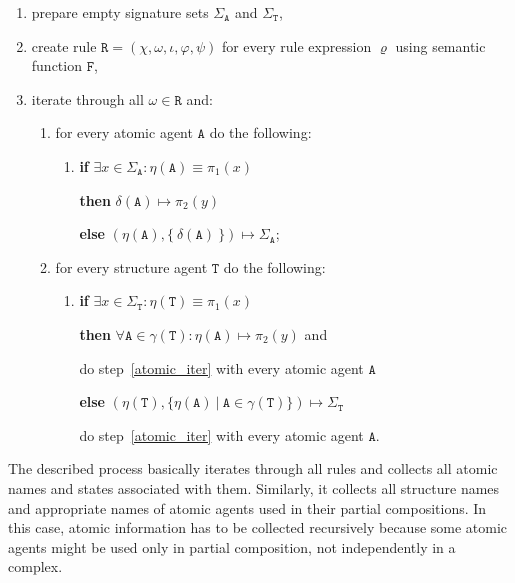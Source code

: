 \documentclass[12pt]{fithesis2}
\begin{document}
\begin{enumerate}
\item prepare empty signature sets $\Sigma_\mathtt{A}$ and $\Sigma_\mathtt{T}$, 
\item create rule $\mathtt{R} = (\chi, \omega, \iota, \varphi, \psi)$ for every rule expression $\varrho$ using semantic function $\mathtt{F}$,
\item iterate through all $\omega \in \mathtt{R}$ and:
\begin{enumerate}
  \item \label{atomic_iter} for every atomic agent $\mathtt{A}$ do the following:
  	\begin{enumerate}
  		\item \textbf{if} $\exists x \in \Sigma_\mathtt{A}: \eta(\mathtt{A}) \equiv \pi_1(x) $ 

  		\textbf{then} $\delta(\mathtt{A}) \mapsto \pi_2(y)$

  		\textbf{else} $(\eta(\mathtt{A}), \{~\delta(\mathtt{A})~\}) \mapsto \Sigma_\mathtt{A}$;
	\end{enumerate}
  \item \label{structure_iter} for every structure agent $\mathtt{T}$ do the following:
	\begin{enumerate}
	  \item \textbf{if} $\exists x \in \Sigma_\mathtt{T}: \eta(\mathtt{T}) \equiv \pi_1(x) $

	  \textbf{then} $\forall \mathtt{A} \in \gamma(\mathtt{T}): \eta(\mathtt{A}) \mapsto \pi_2(y)$ and 

	  \hspace*{1cm} do step~\ref{atomic_iter} with every atomic agent $\mathtt{A}$

	  \textbf{else} $(\eta(\mathtt{T}), \{ \eta(\mathtt{A}) ~|~ \mathtt{A} \in \gamma(\mathtt{T}) \}) \mapsto \Sigma_\mathtt{T}$ 

	  \hspace*{0.75cm} do step~\ref{atomic_iter} with every atomic agent $\mathtt{A}$.
	\end{enumerate}
\end{enumerate}
\end{enumerate}

The described process basically iterates through all rules and collects all atomic names and states associated with them. Similarly, it collects all structure names and appropriate names of atomic agents used in their partial compositions. In this case, atomic information has to be collected recursively because some atomic agents might be used only in partial composition, not independently in a complex.
\end{document}
